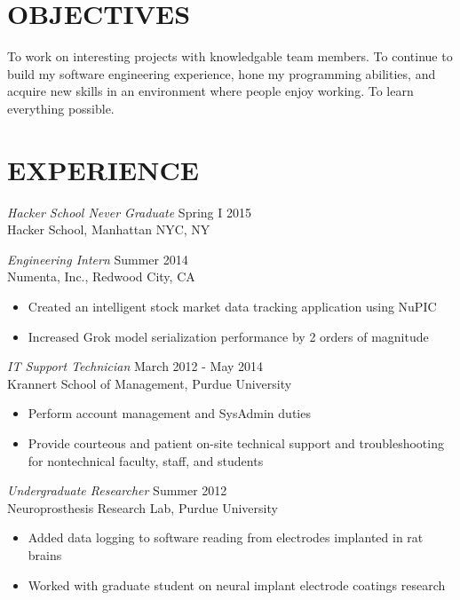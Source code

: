 \documentclass[margin,5pt]{res} %
\begin{document}
\address{me@vsinha.com\\ vsinha.com \\github.com/vsinha}
\address{217 Pierce St. Unit 2 \\ West Lafayette, IN 47906\\(408) 505-1275}


\begin{resume}

 
\section{OBJECTIVES}To work on interesting projects with knowledgable team members. To continue to build
my software engineering experience, hone my programming abilities, and acquire new skills
in an environment where people enjoy working. To learn everything possible.

 
\section{EXPERIENCE} 
	{\sl Hacker School Never Graduate} \hfill Spring I 2015\\
		Hacker School, Manhattan NYC, NY
	
	{\sl Engineering Intern} \hfill Summer 2014\\
          Numenta, Inc., Redwood City, CA
		\begin{itemize} \itemsep -2pt
		\item Created an intelligent stock market data tracking application using NuPIC
		\item Increased Grok model serialization performance by 2 orders of magnitude
		\end{itemize}

	{\sl IT Support Technician} \hfill March 2012 - May 2014 \\
         	Krannert School of Management, Purdue University
		\begin{itemize} \itemsep -2pt
	      \item Perform account management and SysAdmin duties 
           \item Provide courteous and patient on-site technical support and troubleshooting for nontechnical faculty, staff, and students
		\end{itemize}

	{\sl Undergraduate Researcher} \hfill Summer 2012\\
          Neuroprosthesis Research Lab, Purdue University
	    	\begin{itemize} \itemsep -2pt
	    	\item Added data logging to software reading from electrodes implanted in rat brains
	    	\item Worked with graduate student on neural implant electrode coatings research
	    	\end{itemize}


\end{resume}
\end{document}

